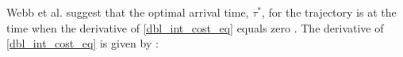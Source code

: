 \documentclass[conference]{IEEEtran}
\begin{document}

Webb et al. suggest that the optimal arrival time, $\tau^{*}$, for the trajectory is at the time when the derivative of \eqref{dbl_int_cost_eq} equals zero \cite{webb2013kinodynamic}. The derivative of \eqref{dbl_int_cost_eq} is given by : 
\end{document}
